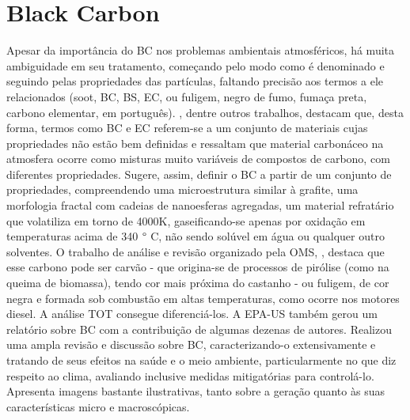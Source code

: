 \newpage
\section{Black Carbon}

Apesar da importância do BC nos problemas ambientais atmosféricos, há muita 
ambiguidade em seu tratamento, começando pelo modo como é denominado e seguindo
pelas propriedades das partículas, faltando precisão aos termos a ele 
relacionados (soot, BC, BS, EC, ou fuligem, negro de fumo, fumaça preta, 
carbono elementar, em português). \citet{petzold2013}, dentre outros trabalhos, 
destacam que, desta forma, termos como BC e EC referem-se a um conjunto de 
materiais cujas propriedades não estão bem definidas e ressaltam que material 
carbonáceo na atmosfera ocorre como misturas muito variáveis de compostos de 
carbono, com diferentes propriedades. Sugere, assim, definir o BC a partir de 
um conjunto de propriedades, compreendendo uma microestrutura similar à grafite,
uma morfologia fractal com cadeias de nanoesferas agregadas, um material 
refratário que volatiliza em torno de 4000K, gaseificando-se apenas por oxidação
em temperaturas acima de 340 $\degree$ C, não sendo solúvel em água ou qualquer
outro solventes. O trabalho de análise e revisão organizado pela OMS, 
\citet{janssen2012}, destaca que esse carbono pode ser carvão - que origina-se 
de processos de pirólise (como na queima de biomassa), tendo cor mais próxima do
castanho - ou fuligem, de cor negra e formada sob combustão em altas 
temperaturas, como ocorre nos motores diesel. A análise TOT consegue 
diferenciá-los. A EPA-US também gerou um relatório sobre BC \citep{epa2012} com
a contribuição de algumas dezenas de autores. Realizou uma ampla revisão e 
discussão sobre BC, caracterizando-o extensivamente e tratando de seus efeitos 
na saúde e o meio ambiente, particularmente no que diz respeito ao clima, 
avaliando inclusive medidas mitigatórias para controlá-lo. 
Apresenta imagens bastante ilustrativas, tanto sobre a geração quanto às suas 
características micro e macroscópicas.

